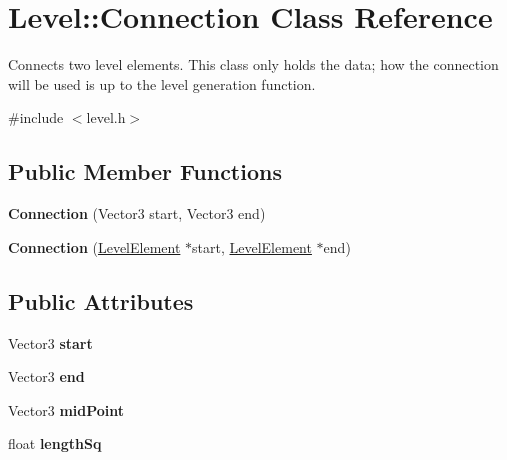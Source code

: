 \hypertarget{classLevel_1_1Connection}{
\section{\-Level\-:\-:\-Connection \-Class \-Reference}
\label{d3/dd3/classLevel_1_1Connection}
}


\-Connects two level elements. \-This class only holds the data; how the connection will be used is up to the level generation function.  




{\ttfamily \#include $<$level.\-h$>$}

\subsection*{\-Public \-Member \-Functions}
\begin{DoxyCompactItemize}
\item 
\hypertarget{classLevel_1_1Connection_a072e34e20391cc1e61c8a511477040f9}{
{\bfseries \-Connection} (\-Vector3 start, \-Vector3 end)}
\label{d3/dd3/classLevel_1_1Connection_a072e34e20391cc1e61c8a511477040f9}

\item 
\hypertarget{classLevel_1_1Connection_a4ac170eb7fd6ad0561d2c1e65f410e9b}{
{\bfseries \-Connection} (\hyperlink{classLevelElement}{\-Level\-Element} $\ast$start, \hyperlink{classLevelElement}{\-Level\-Element} $\ast$end)}
\label{d3/dd3/classLevel_1_1Connection_a4ac170eb7fd6ad0561d2c1e65f410e9b}

\end{DoxyCompactItemize}
\subsection*{\-Public \-Attributes}
\begin{DoxyCompactItemize}
\item 
\hypertarget{classLevel_1_1Connection_aa89822f185be8ca286d3ad358da22720}{
\-Vector3 {\bfseries start}}
\label{d3/dd3/classLevel_1_1Connection_aa89822f185be8ca286d3ad358da22720}

\item 
\hypertarget{classLevel_1_1Connection_a3fd2124930591dcf3271647b1d3d6f3a}{
\-Vector3 {\bfseries end}}
\label{d3/dd3/classLevel_1_1Connection_a3fd2124930591dcf3271647b1d3d6f3a}

\item 
\hypertarget{classLevel_1_1Connection_a9456d6853b767e09ddc646fed7ee15e2}{
\-Vector3 {\bfseries mid\-Point}}
\label{d3/dd3/classLevel_1_1Connection_a9456d6853b767e09ddc646fed7ee15e2}

\item 
\hypertarget{classLevel_1_1Connection_aca4d55f196b85d51d94c511af0b86b6f}{
float {\bfseries length\-Sq}}
\label{d3/dd3/classLevel_1_1Connection_aca4d55f196b85d51d94c511af0b86b6f}

\end{DoxyCompactItemize}


